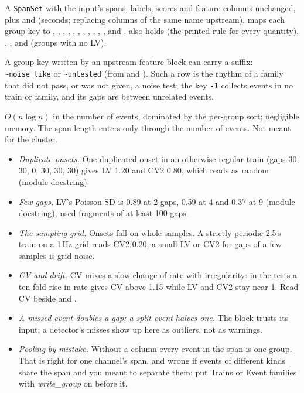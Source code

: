 A \texttt{SpanSet} with the input's spans, labels, scores and feature columns unchanged, plus
 and  (seconds; replacing columns of the same
name upstream).  maps each group key to ,
, , , , , ,
, , , ,  and
.  also holds  (the printed rule for every
quantity), , ,  and
 (groups with no LV).

A group key written by an upstream feature block can carry a suffix:
\texttt{\textasciitilde noise\_like} or \texttt{\textasciitilde untested} (from
 and ). Such a
row is the rhythm of a family that did not pass, or was not given, a noise test; the key
\texttt{-1} collects events in no train or family, and its gaps are between unrelated
events.

$O(n \log n)$ in the number of events, dominated by the per-group sort; negligible memory.
The span length enters only through the number of events. Not meant for the cluster.

\begin{itemize}
\item \emph{Duplicate onsets.} One duplicated onset in an otherwise regular train (gaps 30,
  30, 0, 30, 30, 30) gives LV 1.20 and CV2 0.80, which reads as random (module docstring).
\item \emph{Few gaps.} LV's Poisson SD is 0.89 at 2 gaps, 0.59 at 4 and 0.37 at 9 (module
  docstring); \citet{shinomoto2003differences} used fragments of at least 100 gaps.
\item \emph{The sampling grid.} Onsets fall on whole samples. A strictly periodic 2.5\,s
  train on a 1\,Hz grid reads CV2 0.20; a small LV or CV2 for gaps of a few samples is grid
  noise.
\item \emph{CV and drift.} CV mixes a slow change of rate with irregularity: in the tests a
  ten-fold rise in rate gives CV above 1.15 while LV and CV2 stay near 1. Read CV beside
   and .
\item \emph{A missed event doubles a gap; a split event halves one.} The block trusts its
  input; a detector's misses show up here as outliers, not as warnings.
\item \emph{Pooling by mistake.} Without a  column every event in the span is
  one group. That is right for one channel's span, and wrong if events of different kinds
  share the span and you meant to separate them: put Trains or Event families with
  \emph{write\_group} on before it.
\end{itemize}

